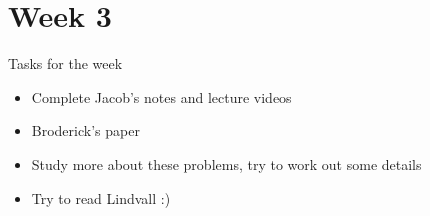 \documentclass{article}
\begin{document}
	\section{Week 3}
		Tasks for the week
		\begin{itemize}
			\item Complete Jacob's notes and lecture videos
			\item Broderick's paper
   			\item Study more about these problems, try to work out some details
      		\item Try to read Lindvall :)
		\end{itemize}
\end{document}
